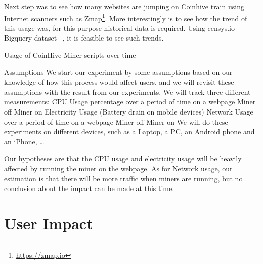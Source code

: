Next step was to see how many websites are jumping on Coinhive train using Internet scanners such as Zmap\footnote{\url{https://zmap.io}}. More interestingly is to see how the trend of this usage was, for this purpose historical data is required. Using censys.io Bigquery dataset ~\cite{censys15}, it is feasible to see such trends.
 
\begin{center}
	\caption{Usage of CoinHive Miner scripts over time}
\end{center}


Assumptions
	We start our experiment by some assumptions based on our knowledge of how this process would affect users, and we will revisit these assumptions with the result from our experiments.
We will track three different measurements:
CPU Usage percentage over a period of time on a webpage
Miner off
Miner on
Electricity Usage (Battery drain on mobile devices)
Network Usage over a period of time on a webpage
Miner off
Miner on
We will do these experiments on different devices, such as a Laptop, a PC, an Android phone and an iPhone, …



Our hypotheses are that the CPU usage and electricity usage will be heavily affected by running the miner on the webpage. As for Network usage, our estimation is that there will be more traffic when miners are running, but no conclusion about the impact can be made at this time.


\section{User Impact}

